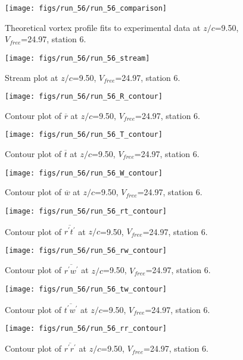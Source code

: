 \begin{figure}[H]
\centering
\texttt{[image: figs/run\_56/run\_56\_comparison]}
\caption{Theoretical vortex profile fits to experimental data at $z/c$=9.50, $V_{free}$=24.97, station 6.}
\end{figure}


\begin{figure}[H]
\centering
\texttt{[image: figs/run\_56/run\_56\_stream]}
\caption{Stream plot at $z/c$=9.50, $V_{free}$=24.97, station 6.}
\end{figure}


\begin{figure}[H]
\centering
\texttt{[image: figs/run\_56/run\_56\_R\_contour]}
\caption{Contour plot of $\overline{r}$ at $z/c$=9.50, $V_{free}$=24.97, station 6.}
\end{figure}


\begin{figure}[H]
\centering
\texttt{[image: figs/run\_56/run\_56\_T\_contour]}
\caption{Contour plot of $\overline{t}$ at $z/c$=9.50, $V_{free}$=24.97, station 6.}
\end{figure}


\begin{figure}[H]
\centering
\texttt{[image: figs/run\_56/run\_56\_W\_contour]}
\caption{Contour plot of $\overline{w}$ at $z/c$=9.50, $V_{free}$=24.97, station 6.}
\end{figure}


\begin{figure}[H]
\centering
\texttt{[image: figs/run\_56/run\_56\_rt\_contour]}
\caption{Contour plot of $\overline{r^\prime t^\prime}$ at $z/c$=9.50, $V_{free}$=24.97, station 6.}
\end{figure}


\begin{figure}[H]
\centering
\texttt{[image: figs/run\_56/run\_56\_rw\_contour]}
\caption{Contour plot of $\overline{r^\prime w^\prime}$ at $z/c$=9.50, $V_{free}$=24.97, station 6.}
\end{figure}


\begin{figure}[H]
\centering
\texttt{[image: figs/run\_56/run\_56\_tw\_contour]}
\caption{Contour plot of $\overline{t^\prime w^\prime}$ at $z/c$=9.50, $V_{free}$=24.97, station 6.}
\end{figure}


\begin{figure}[H]
\centering
\texttt{[image: figs/run\_56/run\_56\_rr\_contour]}
\caption{Contour plot of $\overline{r^\prime r^\prime}$ at $z/c$=9.50, $V_{free}$=24.97, station 6.}
\end{figure}


